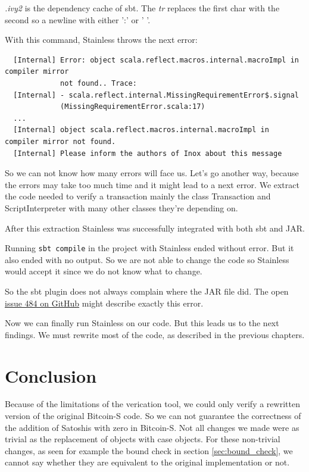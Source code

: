 \documentclass[runningheads]{llncs}
\begin{document}
\emph{.ivy2} is the dependency cache of sbt.  The \emph{tr} replaces
the first char with the second so a newline with either ':' or ' '.

With this command, Stainless throws the next error:
\begin{verbatim}
  [Internal] Error: object scala.reflect.macros.internal.macroImpl in compiler mirror
             not found.. Trace:
  [Internal] - scala.reflect.internal.MissingRequirementError$.signal
             (MissingRequirementError.scala:17)
  ...
  [Internal] object scala.reflect.macros.internal.macroImpl in compiler mirror not found.
  [Internal] Please inform the authors of Inox about this message
\end{verbatim}

So we can not know how many errors will face us.  Let's go another
way, because the errors may take too much time and it might lead to a
next error.  We extract the code needed to verify a transaction mainly
the class Transaction and ScriptInterpreter with many other classes
they're depending on.

After this extraction Stainless was successfully integrated with both
sbt and JAR.

Running \texttt{sbt compile} in the project with Stainless ended
without error.  But it also ended with no output.  So we are not able
to change the code so Stainless would accept it since we do not know
what to change.

So the sbt plugin does not always complain where the JAR file did.
The open
\href{https://github.com/epfl-lara/stainless/issues/484}{issue 484 on
  GitHub} might describe exactly this error.

Now we can finally run Stainless on our code.  But this leads us to
the next findings.  We must rewrite most of the code, as described in
the previous chapters.



\section{Conclusion}
\label{chap:conclusion}

Because of the limitations of the verication tool, we could only
verify a rewritten version of the original Bitcoin-S code.  So we can
not guarantee the correctness of the addition of Satoshis with zero in
Bitcoin-S.  Not all changes we made were as trivial as the replacement
of objects with case objects.  For these non-trivial changes, as seen
for example the bound check in section \ref{sec:bound_check}, we
cannot say whether they are equivalent to the original implementation
or not.
\end{document}
